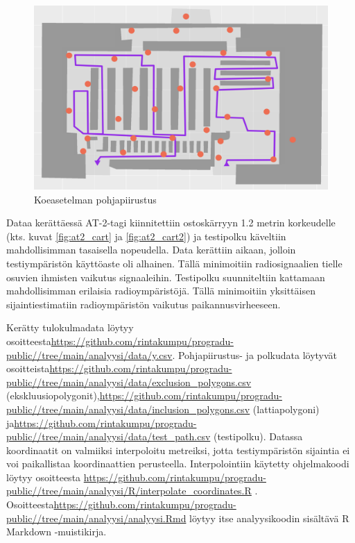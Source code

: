 \documentclass[
  12pt,
  a4paper, twoside]{book}
\begin{document}
\begin{figure}[H]
\centering
\includegraphics[width=15cm]{testipolku_numeroimaton}
\caption{Koeasetelman pohjapiirustus}
\label{fig:testipolku}
\end{figure}

\noindent Dataa kerättäessä AT-2-tagi kiinnitettiin ostoskärryyn 1.2 metrin korkeudelle (kts. kuvat \ref{fig:at2_cart} ja \ref{fig:at2_cart2}) ja testipolku käveltiin mahdollisimman tasaisella nopeudella. Data kerättiin aikaan, jolloin testiympäristön käyttöaste oli alhainen. Tällä minimoitiin radiosignaalien tielle osuvien ihmisten vaikutus signaaleihin. Testipolku suunniteltiin kattamaan mahdollisimman erilaisia radioympäristöjä. Tällä minimoitiin yksittäisen sijaintiestimatiin radioympäristön vaikutus paikannusvirheeseen.

Kerätty tulokulmadata löytyy osoitteesta\newline \url{https://github.com/rintakumpu/progradu-public//tree/main/analyysi/data/y.csv}. Pohjapiirustus- ja polkudata löytyvät osoitteista\newline \url{https://github.com/rintakumpu/progradu-public//tree/main/analyysi/data/exclusion_polygons.csv} (ekskluusiopolygonit),\newline \url{https://github.com/rintakumpu/progradu-public//tree/main/analyysi/data/inclusion_polygons.csv} (lattiapolygoni) ja\newline \url{https://github.com/rintakumpu/progradu-public//tree/main/analyysi/data/test_path.csv} (testipolku). Datassa koordinaatit on valmiiksi interpoloitu metreiksi, jotta testiympäristön sijaintia ei voi paikallistaa koordinaattien perusteella. Interpolointiin käytetty ohjelmakoodi löytyy osoitteesta \newline \url{https://github.com/rintakumpu/progradu-public//tree/main/analyysi/R/interpolate_coordinates.R} . Osoitteesta\newline \url{https://github.com/rintakumpu/progradu-public//tree/main/analyysi/analyysi.Rmd} löytyy itse analyysikoodin sisältävä R Markdown -muistikirja.
\end{document}
